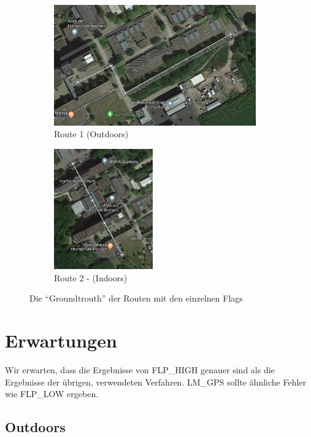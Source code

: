 \begin{figure}[h!]
	\centering
	\begin{subfigure}[b]{.64\textwidth}
		\centering
        \includegraphics[height=5.2cm]{route1}
        \caption{Route  1 (Outdoors)}
        \label{fig:route1}
    \end{subfigure}
    \begin{subfigure}[b]{.35\textwidth}
    	\centering
        \includegraphics[height=5.2cm]{route2}
        \caption{Route 2 - (Indoors)}
        \label{fig:route2}
    \end{subfigure}
    \caption{Die "`Groundtrouth"' der Routen mit den einzelnen Flags}
    \label{fig:routen}
\end{figure}

\section{Erwartungen}

Wir erwarten, dass die Ergebnisse von FLP\_HIGH genauer sind als die Ergebnisse der übrigen, verwendeten Verfahren. LM\_GPS sollte ähnliche Fehler wie FLP\_LOW ergeben. 

\subsection{Outdoors}


%


